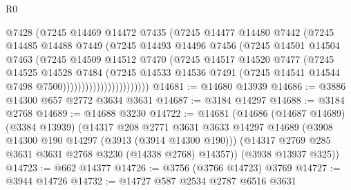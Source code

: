 \begin{lexlean}{R0}
\begin{coremodule}
                              @7428
                              (@7245
                                @14469
                                @14472
                                @7435
                                (@7245
                                  @14477
                                  @14480
                                  @7442
                                  (@7245
                                    @14485
                                    @14488
                                    @7449
                                    (@7245
                                      @14493
                                      @14496
                                      @7456
                                      (@7245
                                        @14501
                                        @14504
                                        @7463
                                        (@7245
                                          @14509
                                          @14512
                                          @7470
                                          (@7245
                                            @14517
                                            @14520
                                            @7477
                                            (@7245
                                              @14525
                                              @14528
                                              @7484
                                              (@7245
                                                @14533
                                                @14536
                                                @7491
                                                (@7245
                                                  @14541
                                                  @14544
                                                  @7498
                                                  @7500)))))))))))))))))))))))
@14681 := @14680 @13939
@14686 := @3886 @14300 @657 @2772 @3634 @3631
@14687 := @3184 @14297
@14688 := @3184 @2768
@14689 := @14688 @3230
@14722 := @14681
    (@14686
      (@14687 @14689)
      (@3384 @13939)
      (@14317
        @208
        @2771
        @3631
        @3633
        @14297
        @14689
        (@3908 @14300 @190 @14297 (@3913 (@3914 @14300 @190)))
        (@14317 @2769 @285 @3631 @3631 @2768 @3230 (@14338 @2768) @14357))
      (@3938 @13937 @325))
@14723 := @662 @14377
@14726 := @3756 (@3766 @14723) @3769
@14727 := @3944 @14726
@14732 := @14727 @587 @2534 @2787 @6516 @3631

\end{coremodule}
\end{lexlean}
